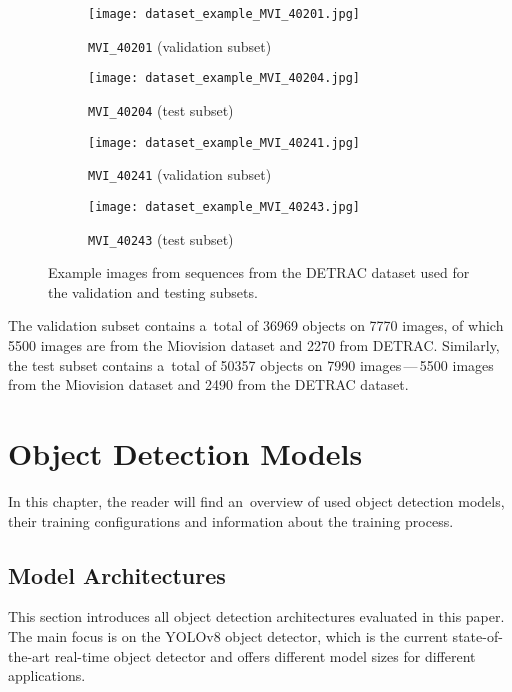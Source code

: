\begin{figure}[t]
    \centering
    \begin{subfigure}[b]{0.495\textwidth}
        \texttt{[image: dataset\_example\_MVI\_40201.jpg]}
        \caption{\texttt{MVI\_40201} (validation subset)}
    \end{subfigure}
    \begin{subfigure}[b]{0.495\textwidth}
        \texttt{[image: dataset\_example\_MVI\_40204.jpg]}
        \caption{\texttt{MVI\_40204} (test subset)}
    \end{subfigure}
    \begin{subfigure}[b]{0.495\textwidth}
        \texttt{[image: dataset\_example\_MVI\_40241.jpg]}
        \caption{\texttt{MVI\_40241} (validation subset)}
    \end{subfigure}
    \begin{subfigure}[b]{0.495\textwidth}
        \texttt{[image: dataset\_example\_MVI\_40243.jpg]}
        \caption{\texttt{MVI\_40243} (test subset)}
    \end{subfigure}
    \caption{Example images from sequences from the DETRAC dataset used for
    the validation and testing subsets.}
    \label{TestValExamples}
\end{figure}

The validation subset contains a~total of \num{36969} objects on \num{7770}
images, of which \num{5500} images are from the Miovision dataset and \num{2270}
from DETRAC. Similarly, the test subset contains a~total of \num{50357}
objects on \num{7990} images\,---\,\num{5500} images from the Miovision dataset and
\num{2490} from the DETRAC dataset.




\chapter{Object Detection Models}
\label{ModelsChapter}

In this chapter, the reader will find an~overview of used object detection
models, their training configurations and information about the training
process.


\section{Model Architectures}

This section introduces all object detection architectures evaluated in this
paper. The main focus is on the YOLOv8 object detector, which is the current
state-of-the-art real-time object detector and offers different model sizes for
different applications.

